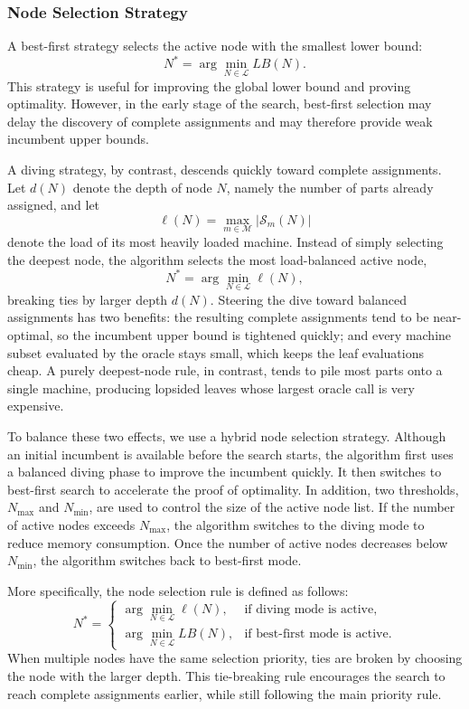 \documentclass[letterpaper, 10 pt, conference]{ieeeconf}  %
\begin{document}
\subsubsection{Node Selection Strategy}

A best-first strategy selects the active node with the smallest lower bound:
\[
N^*=\arg\min_{N\in\mathcal{L}} LB(N).
\]
This strategy is useful for improving the global lower bound and proving
optimality. However, in the early stage of the search, best-first selection
may delay the discovery of complete assignments and may therefore provide
weak incumbent upper bounds.

A diving strategy, by contrast, descends quickly toward complete assignments.
Let $d(N)$ denote the depth of node $N$, namely the number of parts already
assigned, and let
\[
\ell(N)=\max_{m\in\mathcal{M}}\bigl|\mathcal{S}_m(N)\bigr|
\]
denote the load of its most heavily loaded machine. Instead of simply
selecting the deepest node, the algorithm selects the most load-balanced
active node,
\[
N^*=\arg\min_{N\in\mathcal{L}} \ell(N),
\]
breaking ties by larger depth $d(N)$. Steering the dive toward balanced
assignments has two benefits: the resulting complete assignments tend to be
near-optimal, so the incumbent upper bound is tightened quickly; and every
machine subset evaluated by the oracle stays small, which keeps the leaf
evaluations cheap. A purely deepest-node rule, in contrast, tends to pile most
parts onto a single machine, producing lopsided leaves whose largest oracle
call is very expensive.

To balance these two effects, we use a hybrid node selection strategy. Although an initial incumbent is available before the search starts, the algorithm first uses a balanced diving phase to improve the incumbent quickly. It then switches to best-first search to accelerate the proof of optimality. In addition, two thresholds, $N_{\max}$ and $N_{\min}$, are used to control the size of the active node list. If the number of active nodes exceeds $N_{\max}$, the algorithm switches to the diving mode to reduce memory consumption. Once the number of active nodes decreases below $N_{\min}$, the algorithm switches back to best-first mode.

More specifically, the node selection rule is defined as follows:
\[
N^*=
\begin{cases}
	\arg\min_{N\in\mathcal{L}} \ell(N), & \text{if diving mode is active},\\[1mm]
	\arg\min_{N\in\mathcal{L}} LB(N), & \text{if best-first mode is active}.
\end{cases}
\]
When multiple nodes have the same selection priority, ties are broken by
choosing the node with the larger depth. This tie-breaking rule encourages
the search to reach complete assignments earlier, while still following the
main priority rule.
\end{document}

